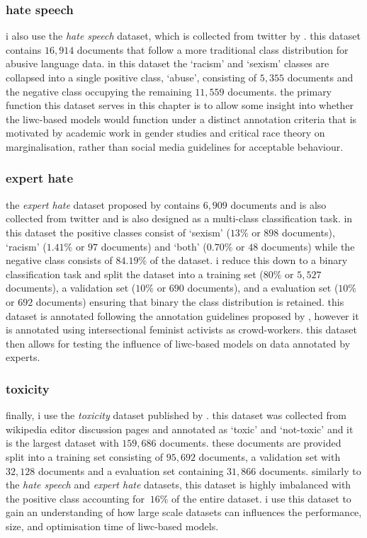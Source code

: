 \subsubsection{hate speech}
i also use the \textit{hate speech} dataset, which is collected from twitter by \citet{waseem-hovy:2016}.
this dataset contains $16,914$ documents that follow a more traditional class distribution for abusive language data.
in this dataset the  `racism' and `sexism' classes are collapsed into a single positive class, `abuse', consisting of $5,355$ documents and the negative class occupying the remaining $11,559$ documents.
the primary function this dataset serves in this chapter is to allow some insight into whether the liwc-based models would function under a distinct annotation criteria that is motivated by academic work in gender studies and critical race theory on marginalisation, rather than social media guidelines for acceptable behaviour.

\subsubsection{expert hate}
the \textit{expert hate} dataset proposed by \citet{waseem:2016} contains $6,909$ documents and is also collected from twitter and is also designed as a multi-class classification task.
in this dataset the positive classes consist of `sexism' ($13\%$ or $898$ documents), `racism' ($1.41\%$ or $97$ documents) and `both' ($0.70\%$ or $48$ documents) while the negative class consists of $84.19\%$ of the dataset.
i reduce this down to a binary classification task and split the dataset into a training set ($80\%$ or $5,527$ documents), a validation set ($10\%$ or $690$ documents), and a evaluation set ($10\%$ or $692$ documents) ensuring that binary the class distribution is retained.
this dataset is annotated following the annotation guidelines proposed by \citet{waseem-hovy:2016}, however it is annotated using intersectional feminist activists as crowd-workers.
this dataset then allows for testing the influence of liwc-based models on data annotated by experts.

\subsubsection{toxicity}
finally, i use the \textit{toxicity} dataset published by \citet{wulczyn:2017}.
this dataset was collected from wikipedia editor discussion pages and annotated as `toxic' and `not-toxic' and it is the largest dataset with $159,686$ documents.
these documents are provided split into a training set consisting of $95,692$ documents, a validation set with $32,128$ documents and a evaluation set containing $31,866$ documents.
similarly to the \textit{hate speech} and \textit{expert hate} datasets, this dataset is highly imbalanced with the positive class accounting for $~16\%$ of the entire dataset.
i use this dataset to gain an understanding of how large scale datasets can influences the performance, size, and optimisation time of liwc-based models.

